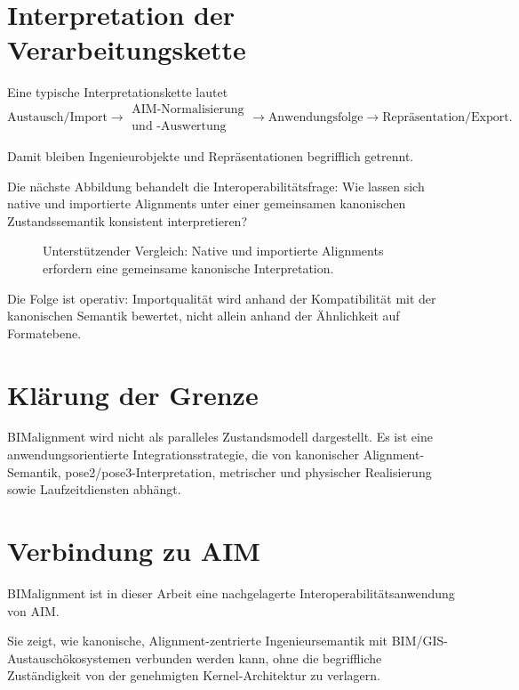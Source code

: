 \section{Interpretation der Verarbeitungskette}

Eine typische Interpretationskette lautet
\[
\text{Austausch/Import}
\rightarrow
\substack{\text{AIM-Normalisierung}\\\text{und -Auswertung}}
\rightarrow
\text{Anwendungsfolge}
\rightarrow
\text{Repräsentation/Export}.
\]

Damit bleiben Ingenieurobjekte und Repräsentationen begrifflich getrennt.

Die nächste Abbildung behandelt die Interoperabilitätsfrage: Wie lassen
sich native und importierte Alignments unter einer gemeinsamen
kanonischen Zustandssemantik konsistent interpretieren?

\begin{figure}[ht]
\centering

\caption{Unterstützender Vergleich: Native und importierte Alignments erfordern eine gemeinsame kanonische Interpretation.}
\label{fig:support-native-vs-imported}
\end{figure}

Die Folge ist operativ: Importqualität wird anhand der Kompatibilität mit
der kanonischen Semantik bewertet, nicht allein anhand der Ähnlichkeit auf
Formatebene.

\section{Klärung der Grenze}

BIMalignment wird nicht als paralleles Zustandsmodell dargestellt. Es ist
eine anwendungsorientierte Integrationsstrategie, die von kanonischer
Alignment-Semantik, pose2/pose3-Interpretation, metrischer und physischer
Realisierung sowie Laufzeitdiensten abhängt.

\section{Verbindung zu AIM}
\begin{summary}
BIMalignment ist in dieser Arbeit eine nachgelagerte
Interoperabilitätsanwendung von AIM.

Sie zeigt, wie kanonische, Alignment-zentrierte Ingenieursemantik mit
BIM/GIS-Austauschökosystemen verbunden werden kann, ohne die begriffliche
Zuständigkeit von der genehmigten Kernel-Architektur zu verlagern.
\end{summary}
